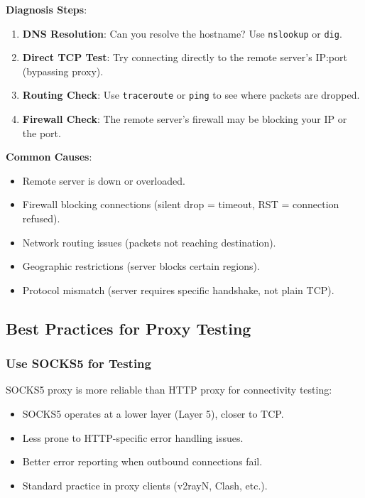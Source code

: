 \textbf{Diagnosis Steps}:
\begin{enumerate}
    \item \textbf{DNS Resolution}: Can you resolve the hostname? Use \texttt{nslookup} or \texttt{dig}.
    \item \textbf{Direct TCP Test}: Try connecting directly to the remote server's IP:port (bypassing proxy).
    \item \textbf{Routing Check}: Use \texttt{traceroute} or \texttt{ping} to see where packets are dropped.
    \item \textbf{Firewall Check}: The remote server's firewall may be blocking your IP or the port.
\end{enumerate}

\textbf{Common Causes}:
\begin{itemize}
    \item Remote server is down or overloaded.
    \item Firewall blocking connections (silent drop = timeout, RST = connection refused).
    \item Network routing issues (packets not reaching destination).
    \item Geographic restrictions (server blocks certain regions).
    \item Protocol mismatch (server requires specific handshake, not plain TCP).
\end{itemize}

\subsection{Best Practices for Proxy Testing}

\subsubsection{Use SOCKS5 for Testing}

SOCKS5 proxy is more reliable than HTTP proxy for connectivity testing:
\begin{itemize}
    \item SOCKS5 operates at a lower layer (Layer 5), closer to TCP.
    \item Less prone to HTTP-specific error handling issues.
    \item Better error reporting when outbound connections fail.
    \item Standard practice in proxy clients (v2rayN, Clash, etc.).
\end{itemize}

